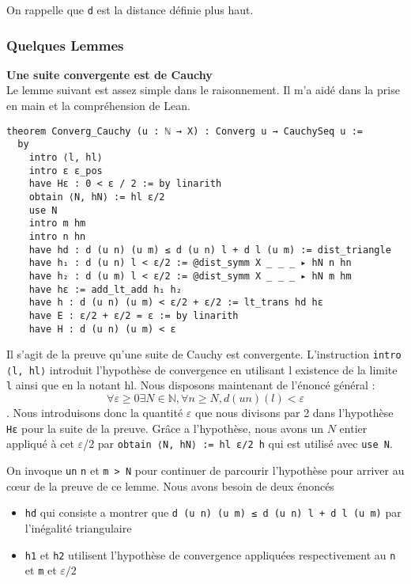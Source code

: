 \documentclass[a4paper, 12pt]{article}
\newcommand{\lean}[1]{\texttt{#1}}
\begin{document}
On rappelle que \lean{d} est la distance définie plus haut.


\subsubsection{Quelques Lemmes}

\textbf{Une suite convergente est de Cauchy}\\

Le lemme suivant est assez simple dans le raisonnement. Il m'a aidé dans la prise en main et la compréhension de Lean.

\begin{verbatim}
theorem Converg_Cauchy (u : ℕ → X) : Converg u → CauchySeq u :=
  by
    intro ⟨l, hl⟩
    intro ε ε_pos
    have Hε : 0 < ε / 2 := by linarith
    obtain ⟨N, hN⟩ := hl ε/2
    use N
    intro m hm
    intro n hn
    have hd : d (u n) (u m) ≤ d (u n) l + d l (u m) := dist_triangle
    have h₁ : d (u n) l < ε/2 := @dist_symm X _ _ _ ▸ hN n hn
    have h₂ : d (u m) l < ε/2 := @dist_symm X _ _ _ ▸ hN m hm
    have hε := add_lt_add h₁ h₂
    have h : d (u n) (u m) < ε/2 + ε/2 := lt_trans hd hε
    have E : ε/2 + ε/2 = ε := by linarith
    have H : d (u n) (u m) < ε
\end{verbatim}


Il s'agit de la preuve qu'une suite de Cauchy est convergente.
L'instruction \lean{intro ⟨l, hl⟩} introduit l'hypothèse de convergence en utilisant l existence de la limite \lean{l} ainsi que en la notant hl. Nous disposons maintenant de l'énoncé général : $$\forall \varepsilon \geq 0 \exists N \in \mathbb{N},\forall n \geq N, d (u n) (l) < \varepsilon$$. Nous introduisons donc la quantité $\varepsilon$ que nous divisons par 2 dans l'hypothèse \lean{Hε} pour la suite de la preuve.
Grâce a l'hypothèse, nous avons un $N$ entier appliqué à cet $\varepsilon$/2 par \lean{obtain ⟨N, hN⟩ := hl ε/2 h} qui est utilisé avec \lean{use N}.

On invoque \lean{un} \lean{n} et \lean{m > N} pour continuer de parcourir l'hypothèse pour arriver au cœur de la preuve de ce lemme. Nous avons besoin de deux énoncés

\begin{itemize}
    \item \lean{hd} qui consiste a montrer que \lean{d (u n) (u m) ≤ d (u n) l + d l (u m)} par l'inégalité triangulaire
    \item \lean{h1} et \lean{h2} utilisent l'hypothèse de convergence appliquées respectivement au \lean{n} et \lean{m} et $\varepsilon/2$
\end{itemize}
\end{document}
